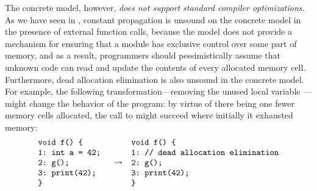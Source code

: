 The concrete model, however, \emph{does not support standard compiler optimizations}.  As we have
seen in , constant propagation is unsound on the concrete model in the
presence of external function calls, because the model does not provide a mechanism for ensuring
that a module has exclusive control over some part of memory, and as a result, programmers should
pessimistically assume that unknown code can read and update the contents of every allocated memory
cell.  Furthermore, dead allocation elimination is also unsound in the concrete model.  For example,
the following transformation---removing the unused local variable ---might change the
behavior of the program: by virtue of there being one fewer memory cells allocated, the call to
 might succeed where initially it exhausted memory:
\[\begin{array}{rcl}
\begin{minipage}{0.23\textwidth}
\begin{verbatim}
void f() {
1: int a = 42;
2: g();
3: print(42);
}
\end{verbatim}
\end{minipage}
&
\optarrow
&
\begin{minipage}{0.5\textwidth}
\begin{verbatim}
void f() {
1: // dead allocation elimination
2: g();
3: print(42);
}
\end{verbatim}
\end{minipage}
\end{array}\]





